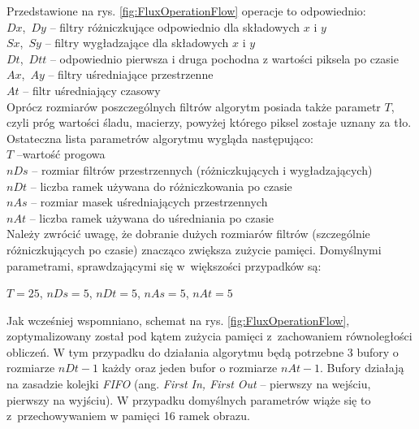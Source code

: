 \documentclass[10pt,a4paper]{article}
\begin{document}
\noindent Przedstawione na rys. \ref{fig:FluxOperationFlow} operacje to odpowiednio: \\
\hspace*{1cm}	$Dx$,\  $Dy$ -- filtry różniczkujące odpowiednio dla składowych $x$ i $y$\\
\hspace*{1cm}	$Sx$,\  $Sy$ -- filtry wygładzające dla składowych $x$ i $y$\\
\hspace*{1cm}	$Dt$,\  $Dtt$ -- odpowiednio pierwsza i druga pochodna z wartości piksela po czasie\\
\hspace*{1cm}	$Ax$,\  $Ay$ -- filtry uśredniające przestrzenne\\
\hspace*{1cm}	$At$ -- filtr uśredniający czasowy\\

Oprócz rozmiarów poszczególnych filtrów algorytm posiada także parametr $T$, czyli próg wartości śladu, macierzy, powyżej którego piksel zostaje uznany za tło. Ostateczna lista parametrów algorytmu wygląda następująco:\\
\-\hspace{1cm} $T$ --wartość progowa\\
\-\hspace{1cm}	$nDs$ -- rozmiar filtrów przestrzennych (różniczkujących i wygładzających)\\
\-\hspace{1cm}	$nDt$ --  liczba ramek używana do różniczkowania po czasie\\
\-\hspace{1cm}	$nAs$ -- rozmiar masek uśredniających przestrzennych\\
\-\hspace{1cm}	$nAt$ -- liczba ramek używana do uśredniania po czasie\\

Należy zwrócić uwagę, że dobranie dużych rozmiarów filtrów (szczególnie różniczkujących po czasie) znacząco zwiększa zużycie pamięci.
Domyślnymi parametrami, sprawdzającymi się w~większości przypadków są: 
\begin{center}
$T = 25$, \quad $nDs = 5$, \quad $nDt = 5$, \quad $nAs = 5$, \quad $nAt = 5$
\end{center}
Jak wcześniej wspomniano, schemat na rys. \ref{fig:FluxOperationFlow}, zoptymalizowany został pod kątem zużycia pamięci z~zachowaniem równoległości obliczeń. W tym przypadku do działania algorytmu będą potrzebne 3 bufory o rozmiarze $nDt-1$ każdy oraz jeden bufor o rozmiarze $nAt-1$. Bufory działają na zasadzie kolejki \textit{FIFO} (ang. \textit{First In, First Out} -- pierwszy na wejściu, pierwszy na wyjściu). W przypadku domyślnych parametrów wiąże się to z~przechowywaniem w pamięci 16 ramek obrazu.
\end{document}
